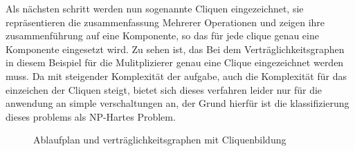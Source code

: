 \documentclass[conference]{IEEEtran}
\begin{document}
Als nächsten schritt werden nun sogenannte Cliquen eingezeichnet, sie repräsentieren die zusammenfassung Mehrerer Operationen und zeigen ihre zusammenführung auf eine Komponente, so das für jede clique genau eine Komponente eingesetzt wird. Zu sehen ist, das Bei dem Verträglichkeitsgraphen in diesem Beispiel für die Mulitplizierer genau eine Clique eingezeichnet werden muss. Da mit steigender Komplexität der aufgabe, auch die Komplexität für das einzeichen der Cliquen steigt, bietet sich dieses verfahren leider nur für die anwendung an simple verschaltungen an, der Grund hierfür ist die klassifizierung dieses problems als NP-Hartes Problem.\cite[S.361]{2}\\
\begin{figure}[h]
\caption{Ablaufplan und verträglichkeitsgraphen mit Cliquenbildung}
\label{fig.3}
\end{figure}


\end{document}
